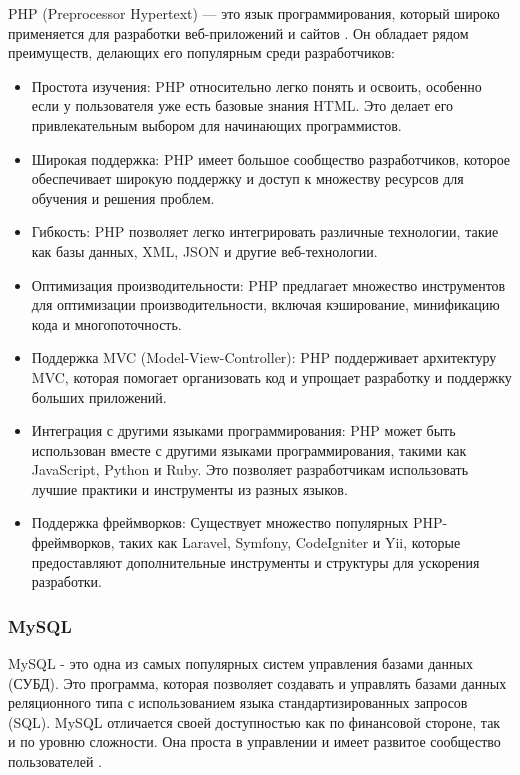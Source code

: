 PHP (Preprocessor Hypertext) — это язык программирования, который широко применяется для разработки веб-приложений и сайтов \cite{gizbert}. Он обладает рядом преимуществ, делающих его популярным среди разработчиков:
\begin{itemize}
	\item Простота изучения: PHP относительно легко понять и освоить, особенно если у пользователя уже есть базовые знания HTML. Это делает его привлекательным выбором для начинающих программистов.
	\item Широкая поддержка: PHP имеет большое сообщество разработчиков, которое обеспечивает широкую поддержку и доступ к множеству ресурсов для обучения и решения проблем.
	\item Гибкость: PHP позволяет легко интегрировать различные технологии, такие как базы данных, XML, JSON и другие веб-технологии.
	\item Оптимизация производительности: PHP предлагает множество инструментов для оптимизации производительности, включая кэширование, минификацию кода и многопоточность.
	\item Поддержка MVC (Model-View-Controller): PHP поддерживает архитектуру MVC, которая помогает организовать код и упрощает разработку и поддержку больших приложений.
	\item Интеграция с другими языками программирования: PHP может быть использован вместе с другими языками программирования, такими как JavaScript, Python и Ruby. Это позволяет разработчикам использовать лучшие практики и инструменты из разных языков.
	\item Поддержка фреймворков: Существует множество популярных PHP-фреймворков, таких как Laravel, Symfony, CodeIgniter и Yii, которые предоставляют дополнительные инструменты и структуры для ускорения разработки.
\end{itemize}

\subsubsection{MySQL}

MySQL - это одна из самых популярных систем управления базами данных (СУБД). Это программа, которая позволяет создавать и управлять базами данных реляционного типа с использованием языка стандартизированных запросов (SQL). MySQL отличается своей доступностью как по финансовой стороне, так и по уровню сложности. Она проста в управлении и имеет развитое сообщество пользователей \cite{brett}.

